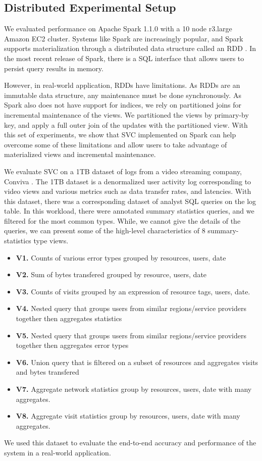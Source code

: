 \subsection{Distributed Experimental Setup}
We evaluated performance on Apache Spark 1.1.0 with a 10 node r3.large Amazon EC2 cluster.
Systems like Spark are increasingly popular, and Spark supports materialization through a distributed data structure called an RDD \cite{zaharia2012resilient}.
In the most recent release of Spark, there is a SQL interface that allows users to persist query results in memory.

However, in real-world application, RDDs have limitations.
As RDDs are an immutable data structure, any maintenance must be done synchronously.
As Spark also does not have support for indices, we rely on partitioned joins for incremental maintenance of the views.
We partitioned the views by primary-by key, and apply a full outer join of the updates with the partitioned view.
With this set of experiments, we show that SVC implemented on Spark can help overcome some of these limitations and allow users to take advantage of materialized views and incremental maintenance.

We evaluate SVC on a 1TB dataset of logs from a video streaming company, Conviva \cite{conviva}.
The 1TB dataset is a denormalized user activity log corresponding to video views and various metrics such as data transfer rates, and latencies.
With this dataset, there was a corresponding dataset of analyst SQL queries on the log table.
In this workload, there were annotated summary statistics queries, and we filtered for the most common types.
While, we cannot give the details of the queries, we can present some of the high-level characteristics of 8 summary-statistics type views. 
\begin{itemize} 
\item \textbf{V1.} Counts of various error types grouped by resources, users, date
\item \textbf{V2.} Sum of bytes transfered grouped by resource, users, date
\item \textbf{V3.} Counts of visits grouped by an expression of resource tags, users, date.
\item \textbf{V4.} Nested query that groups users from similar regions/service providers together then aggregates statistics
\item \textbf{V5.} Nested query that groups users from similar regions/service providers together then aggregates error types
\item \textbf{V6.} Union query that is filtered on a subset of resources and aggregates visits and bytes transfered
\item \textbf{V7.} Aggregate network statistics group by resources, users, date with many aggregates.
\item \textbf{V8.} Aggregate visit statistics group by resources, users, date with many aggregates.
\end{itemize}
We used this dataset to evaluate the end-to-end accuracy and performance of the system in a real-world application.

